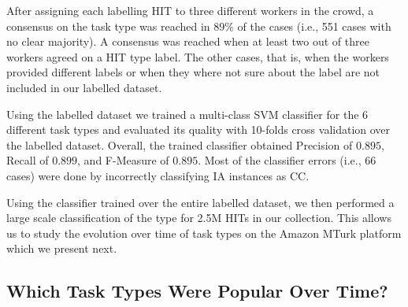 After assigning each labelling HIT to three different workers in the crowd, a consensus on the task type was reached in $89\%$ of the cases (i.e., 551 cases with no clear majority). A consensus was reached when at least two out of three workers agreed on a HIT type label. The other cases, that is, when the workers provided different labels or when they where not sure about the label are not included in our labelled dataset.

Using the labelled dataset we trained a multi-class SVM classifier for the 6 different task types and evaluated its quality with 10-folds cross validation over the labelled dataset. Overall, the trained classifier obtained Precision of $0.895$, Recall of $0.899$, and F-Measure of $0.895$. Most of the classifier errors (i.e., 66 cases) were done by incorrectly classifying IA instances as CC.

Using the classifier trained over the entire labelled dataset, we then performed a large scale classification of the type for 2.5M HITs in our collection. This allows us to study the evolution over time of task types on the Amazon MTurk platform which we present next.

\subsection{Which Task Types Were Popular Over Time?}

